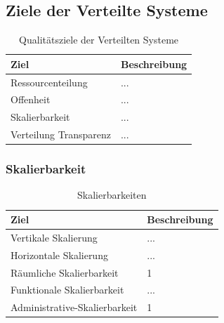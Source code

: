 \clearpage
\subsection{Ziele der Verteilte Systeme}
    \begin{table}[h!]
        \centering
        \begin{tabular}{p{4cm}|p{10cm}}
            \hline
            \textbf{Ziel} & \textbf{Beschreibung} \\
            \hline
            Ressourcenteilung  & ...\\
            Offenheit & ...\\
            Skalierbarkeit & ...\\
            Verteilung Transparenz & ...\\
            \hline
        \end{tabular}
        \caption{Qualitätsziele der Verteilten Systeme}
        \label{tab:qualitaetsziele}
    \end{table}
    
\subsubsection{Skalierbarkeit}
    \begin{table}[h!]
            \centering
            \begin{tabular}{p{4cm}|p{10cm}}
                \hline
                \textbf{Ziel} & \textbf{Beschreibung} \\
                \hline
                Vertikale Skalierung   & ...\\
                Horizontale Skalierung & ...\\
                Räumliche Skalierbarkeit &  1\\
                Funktionale Skalierbarkeit & ...\\
                Administrative-Skalierbarkeit & 1 \\
                \hline
            \end{tabular}
            \caption{Skalierbarkeiten}
            \label{tab:qualitaetsziele}
        \end{table}
    
\newpage

